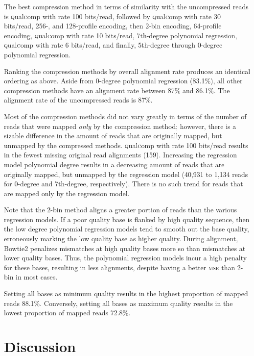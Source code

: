 \documentclass{bioinfo}
\begin{document}
The best compression method in terms of similarity with the
uncompressed reads is \textsc{q}ual\textsc{c}omp with rate 100
bits/read, followed by \textsc{q}ual\textsc{c}omp with rate 30
bits/read, 256-, and 128-profile encoding, then 2-bin encoding,
64-profile encoding, \textsc{q}ual\textsc{c}omp with rate 10
bits/read, 7th-degree polynomial regression,
\textsc{q}ual\textsc{c}omp with rate 6 bits/read, and finally,
5th-degree through 0-degree polynomial regression.

Ranking the compression methods by overall alignment rate produces an
identical ordering as above. Aside from 0-degree polynomial regression
(83.1\%), all other compression methods have an alignment rate between
87\% and 86.1\%. The alignment rate of the uncompressed reads is 87\%.

Most of the compression methods did not vary greatly in terms of the
number of reads that were mapped \emph{only} by the compression
method; however, there is a sizable difference in the amount of reads
that are originally mapped, but unmapped by the compressed methods.
\textsc{q}ual\textsc{c}omp with rate 100 bits/read results in the
fewest missing original read alignments (159). Increasing the
regression model polynomial degree results in a decreasing amount of
reads that are originally mapped, but unmapped by the regression model
(40,931 to 1,134 reads for 0-degree and 7th-degree,
respectively). There is no such trend for reads that are mapped only
by the regression model.

Note that the 2-bin method aligns a
greater portion of reads than the various regression models. If a
poor quality base is flanked by high quality sequence, then the low
degree polynomial regression models tend to smooth out the base
quality, erroneously marking the low quality base as higher quality.
During alignment, Bowtie2 penalizes mismatches at high quality bases
more so than mismatches at lower quality bases. Thus, the polynomial
regression models incur a high penalty for these bases, resulting in
less alignments, despite having a better \textsc{mse} than 2-bin in
most cases.

Setting all bases as minimum quality results in the highest proportion
of mapped reads 88.1\%. Conversely, setting all bases as maximum
quality results in the lowest proportion of mapped reads 72.8\%.

\section{Discussion}
\end{document}
